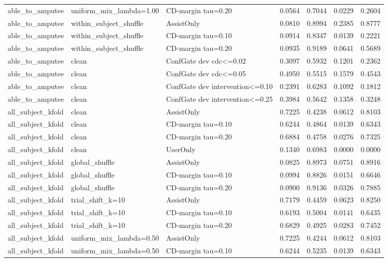 \begin{table}[!t]
\begin{tabular}{lllrrrr}
able\_to\_amputee & uniform\_mix\_lambda=1.00 & CD-margin tau=0.20 & 0.0564 & 0.7044 & 0.0229 & 0.2604 \\
able\_to\_amputee & within\_subject\_shuffle & AssistOnly & 0.0810 & 0.8994 & 0.2385 & 0.8777 \\
able\_to\_amputee & within\_subject\_shuffle & CD-margin tau=0.10 & 0.0914 & 0.8347 & 0.0139 & 0.2221 \\
able\_to\_amputee & within\_subject\_shuffle & CD-margin tau=0.20 & 0.0935 & 0.9189 & 0.0641 & 0.5689 \\
able\_to\_amputee & clean & ConfGate dev cdc<=0.02 & 0.3097 & 0.5932 & 0.1201 & 0.2362 \\
able\_to\_amputee & clean & ConfGate dev cdc<=0.05 & 0.4950 & 0.5515 & 0.1579 & 0.4543 \\
able\_to\_amputee & clean & ConfGate dev intervention<=0.10 & 0.2391 & 0.6283 & 0.1092 & 0.1812 \\
able\_to\_amputee & clean & ConfGate dev intervention<=0.25 & 0.3984 & 0.5642 & 0.1358 & 0.3248 \\
all\_subject\_kfold & clean & AssistOnly & 0.7225 & 0.4238 & 0.0612 & 0.8103 \\
all\_subject\_kfold & clean & CD-margin tau=0.10 & 0.6244 & 0.4864 & 0.0139 & 0.6343 \\
all\_subject\_kfold & clean & CD-margin tau=0.20 & 0.6884 & 0.4758 & 0.0276 & 0.7325 \\
all\_subject\_kfold & clean & UserOnly & 0.1340 & 0.6983 & 0.0000 & 0.0000 \\
all\_subject\_kfold & global\_shuffle & AssistOnly & 0.0825 & 0.8973 & 0.0751 & 0.8916 \\
all\_subject\_kfold & global\_shuffle & CD-margin tau=0.10 & 0.0994 & 0.8826 & 0.0151 & 0.6646 \\
all\_subject\_kfold & global\_shuffle & CD-margin tau=0.20 & 0.0900 & 0.9136 & 0.0326 & 0.7885 \\
all\_subject\_kfold & trial\_shift\_k=10 & AssistOnly & 0.7179 & 0.4459 & 0.0623 & 0.8250 \\
all\_subject\_kfold & trial\_shift\_k=10 & CD-margin tau=0.10 & 0.6193 & 0.5004 & 0.0141 & 0.6435 \\
all\_subject\_kfold & trial\_shift\_k=10 & CD-margin tau=0.20 & 0.6829 & 0.4925 & 0.0283 & 0.7452 \\
all\_subject\_kfold & uniform\_mix\_lambda=0.50 & AssistOnly & 0.7225 & 0.4244 & 0.0612 & 0.8103 \\
all\_subject\_kfold & uniform\_mix\_lambda=0.50 & CD-margin tau=0.10 & 0.6244 & 0.5235 & 0.0139 & 0.6343 \\

\end{tabular}
\end{table}
